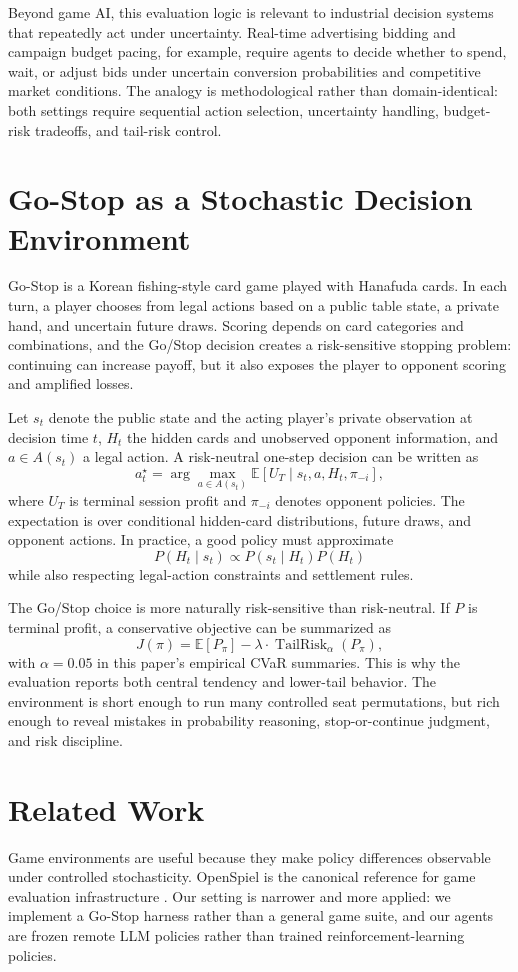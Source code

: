 \documentclass[11pt]{article}
\begin{document}
Beyond game AI, this evaluation logic is relevant to industrial decision systems that repeatedly act under uncertainty. Real-time advertising bidding and campaign budget pacing, for example, require agents to decide whether to spend, wait, or adjust bids under uncertain conversion probabilities and competitive market conditions. The analogy is methodological rather than domain-identical: both settings require sequential action selection, uncertainty handling, budget-risk tradeoffs, and tail-risk control.

\section{Go-Stop as a Stochastic Decision Environment}
Go-Stop is a Korean fishing-style card game played with Hanafuda cards. In each turn, a player chooses from legal actions based on a public table state, a private hand, and uncertain future draws. Scoring depends on card categories and combinations, and the Go/Stop decision creates a risk-sensitive stopping problem: continuing can increase payoff, but it also exposes the player to opponent scoring and amplified losses.

Let $s_t$ denote the public state and the acting player's private observation at decision time $t$, $H_t$ the hidden cards and unobserved opponent information, and $a \in A(s_t)$ a legal action. A risk-neutral one-step decision can be written as
\[
    a_t^\star = \arg\max_{a \in A(s_t)}
    \mathbb{E}\left[U_T \mid s_t, a, H_t, \pi_{-i}\right],
\]
where $U_T$ is terminal session profit and $\pi_{-i}$ denotes opponent policies. The expectation is over conditional hidden-card distributions, future draws, and opponent actions. In practice, a good policy must approximate
\[
    P(H_t \mid s_t) \propto P(s_t \mid H_t)P(H_t)
\]
while also respecting legal-action constraints and settlement rules.

The Go/Stop choice is more naturally risk-sensitive than risk-neutral. If $P$ is terminal profit, a conservative objective can be summarized as
\[
    J(\pi) = \mathbb{E}[P_\pi] - \lambda \cdot \operatorname{TailRisk}_\alpha(P_\pi),
\]
with $\alpha=0.05$ in this paper's empirical CVaR summaries. This is why the evaluation reports both central tendency and lower-tail behavior. The environment is short enough to run many controlled seat permutations, but rich enough to reveal mistakes in probability reasoning, stop-or-continue judgment, and risk discipline.

\section{Related Work}
Game environments are useful because they make policy differences observable under controlled stochasticity. OpenSpiel is the canonical reference for game evaluation infrastructure \citep{lanctot2019openspiel, openspiel_repo}. Our setting is narrower and more applied: we implement a Go-Stop harness rather than a general game suite, and our agents are frozen remote LLM policies rather than trained reinforcement-learning policies.
\end{document}
